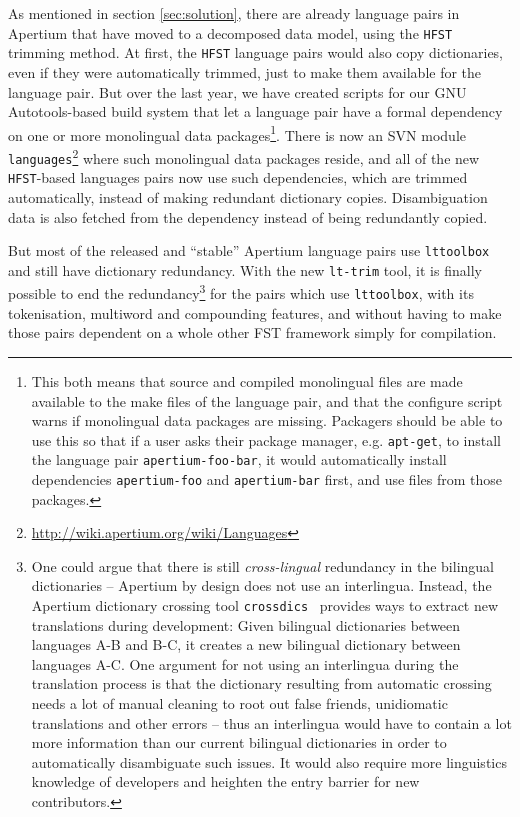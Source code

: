 \documentclass[10pt, a4paper]{article}
\newcommand{\tool}[1]{\texttt{#1}}
\begin{document}
As mentioned in section \ref{sec:solution}, there are already language
pairs in Apertium that have moved to a decomposed data model, using
the \tool{HFST} trimming method. At first, the \tool{HFST} language
pairs would also copy dictionaries, even if they were automatically
trimmed, just to make them available for the language pair.  But over
the last year, we have created scripts for our GNU Autotools-based
build system that let a language pair have a formal dependency on one
or more monolingual data packages\footnote{This both means that source
    and compiled monolingual files are made available to the make
    files of the language pair, and that the configure script warns if
    monolingual data packages are missing. Packagers should be able to
    use this so 
    that if a user asks their package manager, e.g. \tool{apt-get}, to
    install the language pair \tool{apertium-foo-bar}, it would
automatically install dependencies \tool{apertium-foo} and
\tool{apertium-bar} first, and use files from those packages.}.  There
is now an SVN module
\texttt{languages}\footnote{\href{http://wiki.apertium.org/wiki/Languages}{http://wiki.apertium.org/wiki/Languages}}
where such monolingual data packages reside, and all of the new
\tool{HFST}-based languages pairs now use such dependencies, which are
trimmed automatically, instead of making redundant dictionary copies.
Disambiguation data is also fetched from the dependency instead of
being redundantly copied.

But most of the released and ``stable'' Apertium language pairs use
\tool{lttoolbox} and still have dictionary redundancy. With the new
\tool{lt-trim} tool, it is finally possible to end the
redundancy\footnote{One could argue that there is still
  \emph{cross-lingual} redundancy in the bilingual dictionaries --
  Apertium by design does not use an interlingua. Instead, the
  Apertium dictionary crossing tool
  \tool{crossdics}~\cite{toral2011crossdics-it-ca} provides ways to
  extract new translations during development: Given bilingual
  dictionaries between languages A-B and B-C, it creates a new
  bilingual dictionary between languages A-C. One argument for not
  using an interlingua during the translation process is that the
  dictionary resulting from automatic crossing needs a lot of manual
  cleaning to root out false friends, unidiomatic translations and
  other errors -- thus an interlingua would have to contain a lot more
  information than our current bilingual dictionaries in order to
  automatically disambiguate such issues. It would also require more
  linguistics knowledge of developers and heighten the entry barrier
  for new contributors.} for the pairs which use \tool{lttoolbox},
with its tokenisation, multiword and compounding features, and without
having to make those pairs dependent on a whole other FST framework
simply for compilation.
\end{document}
